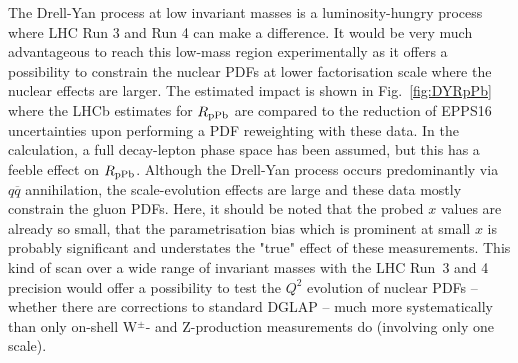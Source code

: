 \documentclass[../report.tex]{subfiles}
\begin{document}
%
The Drell-Yan process at low invariant masses is a luminosity-hungry process where LHC Run 3 and Run 4 can make a difference. It would be very much advantageous to reach this low-mass region experimentally as it offers a possibility to constrain the nuclear PDFs at lower factorisation scale where the nuclear effects are larger. The estimated impact is shown in Fig.~\ref{fig:DYRpPb} where the LHCb estimates for $R_{\rm pPb}$ are compared to the reduction of EPPS16 uncertainties upon performing a PDF reweighting \cite{Paukkunen:2014zia} with these data. In the calculation, a full decay-lepton phase space has been assumed, but this has a feeble effect on $R_{\rm pPb}$. Although the Drell-Yan process occurs predominantly via $q\overline{q}$ annihilation, the scale-evolution effects are large and these data mostly constrain the gluon PDFs. Here, it should be noted that the probed $x$ values are already so small, that the parametrisation bias which is prominent at small $x$ \cite{Aschenauer:2017oxs, Paukkunen:2017phq} is probably significant and understates the "true" effect of these measurements. This kind of scan over a wide range of invariant masses with the LHC Run~3 and 4 precision would offer a possibility to test the $Q^2$ evolution of nuclear PDFs -- whether there are corrections to standard DGLAP -- much more systematically than only on-shell W$^\pm$- and Z-production measurements do (involving only one scale).




%

\end{document}
